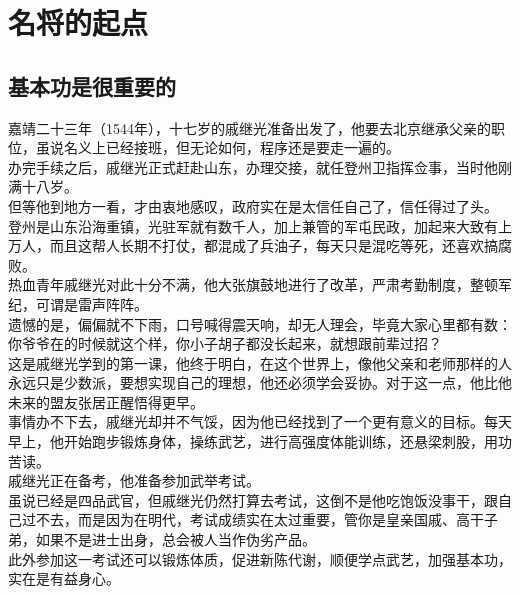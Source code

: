 \section{名将的起点}
\ifnum{}
	\begin{multicols}{\theparacolNo}
\fi
\subsection{基本功是很重要的}
嘉靖二十三年（1544年），十七岁的戚继光准备出发了，他要去北京继承父亲的职位，虽说名义上已经接班，但无论如何，程序还是要走一遍的。\\

办完手续之后，戚继光正式赶赴山东，办理交接，就任登州卫指挥佥事，当时他刚满十八岁。\\

但等他到地方一看，才由衷地感叹，政府实在是太信任自己了，信任得过了头。\\

登州是山东沿海重镇，光驻军就有数千人，加上兼管的军屯民政，加起来大致有上万人，而且这帮人长期不打仗，都混成了兵油子，每天只是混吃等死，还喜欢搞腐败。\\

热血青年戚继光对此十分不满，他大张旗鼓地进行了改革，严肃考勤制度，整顿军纪，可谓是雷声阵阵。\\

遗憾的是，偏偏就不下雨，口号喊得震天响，却无人理会，毕竟大家心里都有数：你爷爷在的时候就这个样，你小子胡子都没长起来，就想跟前辈过招？\\

这是戚继光学到的第一课，他终于明白，在这个世界上，像他父亲和老师那样的人永远只是少数派，要想实现自己的理想，他还必须学会妥协。对于这一点，他比他未来的盟友张居正醒悟得更早。\\

事情办不下去，戚继光却并不气馁，因为他已经找到了一个更有意义的目标。每天早上，他开始跑步锻炼身体，操练武艺，进行高强度体能训练，还悬梁刺股，用功苦读。\\

戚继光正在备考，他准备参加武举考试。\\

虽说已经是四品武官，但戚继光仍然打算去考试，这倒不是他吃饱饭没事干，跟自己过不去，而是因为在明代，考试成绩实在太过重要，管你是皇亲国戚、高干子弟，如果不是进士出身，总会被人当作伪劣产品。\\

此外参加这一考试还可以锻炼体质，促进新陈代谢，顺便学点武艺，加强基本功，实在是有益身心。\\


\end{multicols}
